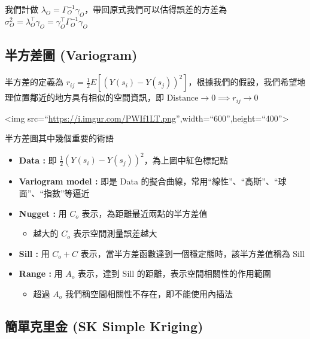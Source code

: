 \documentclass[
]{book}
\providecommand{\tightlist}{%
  \setlength{\itemsep}{0pt}\setlength{\parskip}{0pt}}
\begin{document}
我們計做 \(\lambda_O = \Gamma_O^{-1}\gamma_O\)，帶回原式我們可以估得誤差的方差為 \(\sigma^2_O =\lambda_O^\top\gamma_O= \gamma_O^\top \Gamma_O^{-1}\gamma_O\)

\hypertarget{ux534aux65b9ux5deeux5716-variogram}{%
\subsection{半方差圖 (Variogram)}\label{ux534aux65b9ux5deeux5716-variogram}}

半方差的定義為 \(r_{ij} = \frac{1}{2}E[(Y(s_i) - Y(s_j))^2]\)，根據我們的假設，我們希望地理位置鄰近的地方具有相似的空間資訊，即 \(\mbox{Distance}\rightarrow 0 \implies r_{ij} \rightarrow 0\)

\textless img src=``\url{https://i.imgur.com/PWIf1LT.png}'',width=``600'',height=``400''\textgreater{}

半方差圖其中幾個重要的術語

\begin{itemize}
\tightlist
\item
  \textbf{Data :} 即 \(\frac{1}{2}(Y(s_i) - Y(s_j))^2\)，為上圖中紅色標記點
\item
  \textbf{Variogram model :} 即是 Data 的擬合曲線，常用``線性''、``高斯''、``球面''、``指數''等逼近
\item
  \textbf{Nugget :} 用 \(C_o\) 表示，為距離最近兩點的半方差值

  \begin{itemize}
  \tightlist
  \item
    越大的 \(C_o\) 表示空間測量誤差越大
  \end{itemize}
\item
  \textbf{Sill :} 用 \(C_o + C\) 表示，當半方差函數達到一個穩定態時，該半方差值稱為 Sill
\item
  \textbf{Range :} 用 \(A_o\) 表示，達到 Sill 的距離，表示空間相關性的作用範圍

  \begin{itemize}
  \tightlist
  \item
    超過 \(A_o\) 我們稱空間相關性不存在，即不能使用內插法
  \end{itemize}
\end{itemize}

\hypertarget{ux7c21ux55aeux514bux91ccux91d1-sk-simple-kriging}{%
\subsection{簡單克里金 (SK Simple Kriging)}\label{ux7c21ux55aeux514bux91ccux91d1-sk-simple-kriging}}
\end{document}
